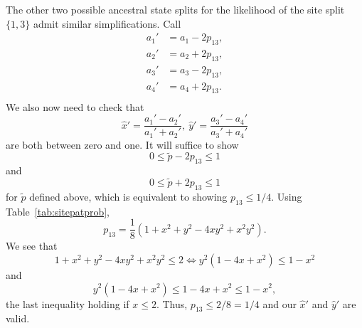 \documentclass{article}
\begin{document}
The other two possible ancestral state splits for the likelihood of the site split $\{1,3\}$ admit similar simplifications.
Call
\begin{equation}
    \begin{aligned}
        a_{1}' &= a_{1}-2p_{13}, \\
        a_{2}' &= a_{2}+2p_{13}, \\
        a_{3}' &= a_{3}-2p_{13}, \\
        a_{4}' &= a_{4}+2p_{13}. \\
    \end{aligned}
    \label{eq:a_const_prime}
\end{equation}
We also now need to check that
$$
\hat{x}' = \frac{a_{1}'-a_{2}'}{a_{1}'+a_{2}'}, \ \hat{y}' = \frac{a_{3}'-a_{4}'}{a_{3}'+a_{4}'}
$$
are both between zero and one.
It will suffice to show
$$
0 \le \tilde{p} - 2p_{13} \le 1
$$
and
$$
0 \le \tilde{p} + 2p_{13} \le 1
$$
for $\tilde{p}$ defined above, which is equivalent to showing $p_{13} \le 1/4$.
Using Table~\ref{tab:sitepatprob},
$$
p_{13} = \frac{1}{8}\left(1 + x^2 + y^2 - 4xy^2 + x^2y^2\right).
$$
We see that
$$
1 + x^2 + y^2 - 4xy^2 + x^2y^2 \le 2 \iff y^2\left(1 - 4x + x^2\right) \le 1 - x^2
$$
and
$$
y^2\left(1 - 4x + x^2\right) \le 1 - 4x + x^2 \le 1 - x^2,
$$
the last inequality holding if $x \le 2$.
Thus, $p_{13} \le 2/8 = 1/4$ and our $\hat{x}'$ and $\hat{y}'$ are valid.
\end{document}
